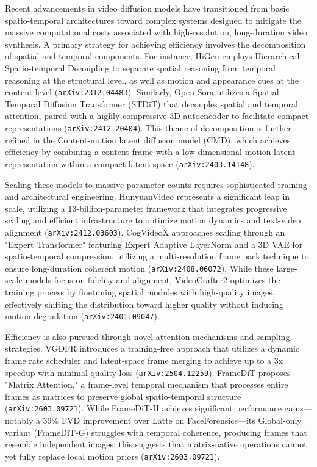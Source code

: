 \documentclass[11pt]{article}
\begin{document}
Recent advancements in video diffusion models have transitioned from basic spatio-temporal architectures toward complex systems designed to mitigate the massive computational costs associated with high-resolution, long-duration video synthesis. A primary strategy for achieving efficiency involves the decomposition of spatial and temporal components. For instance, HiGen employs Hierarchical Spatio-temporal Decoupling to separate spatial reasoning from temporal reasoning at the structural level, as well as motion and appearance cues at the content level (\texttt{arXiv:2312.04483}). Similarly, Open-Sora utilizes a Spatial-Temporal Diffusion Transformer (STDiT) that decouples spatial and temporal attention, paired with a highly compressive 3D autoencoder to facilitate compact representations (\texttt{arXiv:2412.20404}). This theme of decomposition is further refined in the Content-motion latent diffusion model (CMD), which achieves efficiency by combining a content frame with a low-dimensional motion latent representation within a compact latent space (\texttt{arXiv:2403.14148}).

Scaling these models to massive parameter counts requires sophisticated training and architectural engineering. HunyuanVideo represents a significant leap in scale, utilizing a 13-billion-parameter framework that integrates progressive scaling and efficient infrastructure to optimize motion dynamics and text-video alignment (\texttt{arXiv:2412.03603}). CogVideoX approaches scaling through an "Expert Transformer" featuring Expert Adaptive LayerNorm and a 3D VAE for spatio-temporal compression, utilizing a multi-resolution frame pack technique to ensure long-duration coherent motion (\texttt{arXiv:2408.06072}). While these large-scale models focus on fidelity and alignment, VideoCrafter2 optimizes the training process by finetuning spatial modules with high-quality images, effectively shifting the distribution toward higher quality without inducing motion degradation (\texttt{arXiv:2401.09047}).

Efficiency is also pursued through novel attention mechanisms and sampling strategies. VGDFR introduces a training-free approach that utilizes a dynamic frame rate scheduler and latent-space frame merging to achieve up to a 3x speedup with minimal quality loss (\texttt{arXiv:2504.12259}). FrameDiT proposes "Matrix Attention," a frame-level temporal mechanism that processes entire frames as matrices to preserve global spatio-temporal structure (\texttt{arXiv:2603.09721}). While FrameDiT-H achieves significant performance gains—notably a 39\% FVD improvement over Latte on FaceForensics—its Global-only variant (FrameDiT-G) struggles with temporal coherence, producing frames that resemble independent images; this suggests that matrix-native operations cannot yet fully replace local motion priors (\texttt{arXiv:2603.09721}).
\end{document}

